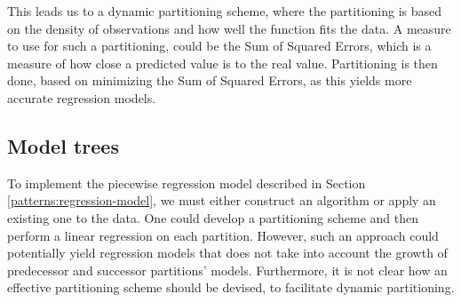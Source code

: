 This leads us to a dynamic partitioning scheme, where the partitioning is based on the density of observations and how well the function fits the data. A measure to use for such a partitioning, could be the Sum of Squared Errors, which is a measure of how close a predicted value is to the real value. Partitioning is then done, based on minimizing the Sum of Squared Errors, as this yields more accurate regression models.



\subsection{Model trees}\label{patterns:weka}
To implement the piecewise regression model described in Section \ref{patterns:regression-model}, we must either construct an algorithm or apply an existing one to the data. One could develop a partitioning scheme and then perform a linear regression on each partition. However, such an approach could potentially yield regression models that does not take into account the growth of predecessor and successor partitions' models. Furthermore, it is not clear how an effective partitioning scheme should be devised, to facilitate dynamic partitioning.

